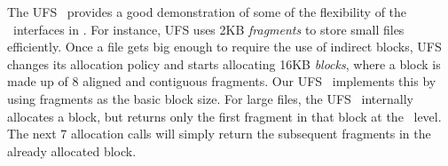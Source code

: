 The UFS \module\ provides a good demonstration of some of the flexibility of the
\module\ interfaces in \Kudos. For instance, UFS uses 2KB \emph{fragments} to
store small files efficiently. Once a file gets big enough to require the use of
indirect blocks, UFS changes its allocation policy and starts allocating 16KB
\emph{blocks}, where a block is made up of 8 aligned and contiguous fragments.
Our UFS \module\ implements this by using fragments as the basic block size. For
large files, the UFS \module\ internally allocates a block, but returns only the
first fragment in that block at the \LFS\ level. The next 7 allocation calls
will simply return the subsequent fragments in the already allocated block.

%
%

\begin{comment}
\subsection{Case Insensitivity}
\label{sec:modules:icase}

\Kudos\ provides a case insensitivity \module\ at the CFS layer. It allows file
systems such as UFS and ext2, which inherently handle filenames case
sensitively, to become case insensitive. If a user needs to run an application
that expects the underlying filenames to be case insensitive on top of a case
sensitive file system, they can simply add this \module\ to the \Kudos\
\module\ graph. By allowing a \module\ to intercept actions between the CFS and
\LFS\ layers, filename transformations can be made transparently for the user
regardless of the on-disk storage format of the actual filename.
\end{comment}
